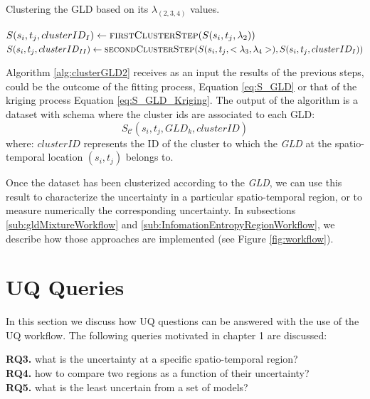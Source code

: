 \begin{algorithm} 
\caption{Clustering the GLD based on its $\lambda_{(2,3,4)}$ values.}\label{alg:clusterGLD2}
\begin{algorithmic}[1] 
\State $S(s_{i},t_{j}, clusterID_{I}) \gets \Call {firstClusterStep}{S(s_{i},t_{j},\lambda_{2})}$
\State $S(s_{i},t_{j}, clusterID_{II}) \gets \Call {secondClusterStep}{S(s_{i},t_{j},<\lambda_{3},\lambda_{4}>), S(s_{i},t_{j}, clusterID_{I})}$
\EndFor
\EndFunction 
\end{algorithmic} 
\end{algorithm} 

Algorithm \ref{alg:clusterGLD2} receives as an input the results of the previous steps, could be the outcome of the fitting process, Equation \ref{eq:S_GLD} or that of the kriging process Equation \ref{eq:S_GLD_Kriging}. The output of the algorithm is a dataset with schema where the cluster ids are associated to each GLD:
\begin{equation}
S_{\mathcal{C}}(s_{i},t_{j},GLD_{k},clusterID)
\end{equation}
where:
$clusterID$ represents the ID of the cluster to which the \textit{GLD} at the spatio-temporal location $(s_{i},t_{j})$ belongs to.

Once the dataset has been clusterized according to the \textit{GLD}, we can use this result to characterize the uncertainty in a particular spatio-temporal region, or to measure numerically the corresponding uncertainty. In subsections \ref{sub:gldMixtureWorkflow} and \ref{sub:InfomationEntropyRegionWorkflow}, we describe how those approaches are implemented (see Figure \ref{fig:workflow}).

\section{UQ Queries}\label{sec:queries}
In this section we discuss how UQ questions can be answered with the use of the UQ workflow. The following queries motivated in chapter 1 are discussed:

\begin{tcolorbox}
\textbf{RQ3.} what is the uncertainty at a specific spatio-temporal region? \\
\textbf{RQ4.} how to compare two regions as a function of their uncertainty? \\
\textbf{RQ5.} what is the least uncertain from a set of models?
\end{tcolorbox}

